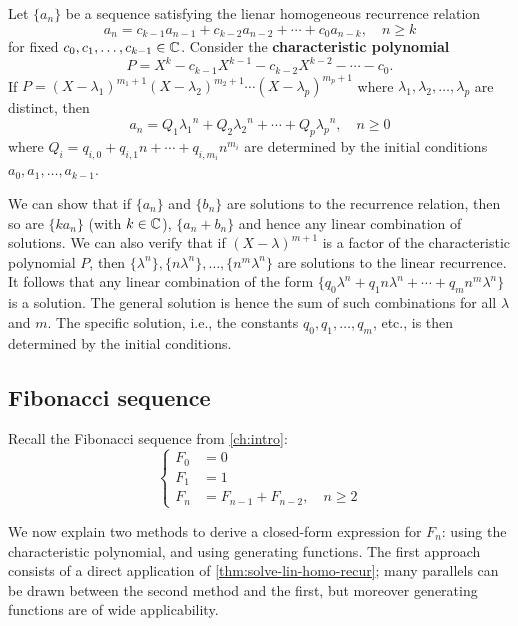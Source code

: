 \documentclass[a4paper, 12pt]{report}
\begin{document}
\begin{thm}\label{thm:solve-lin-homo-recur}
Let $\{a_n\}$ be a sequence satisfying the lienar homogeneous recurrence relation
\[a_n = c_{k - 1} a_{n - 1} + c_{k - 2} a_{n - 2} + \cdots + c_0 a_{n - k}, \quad n \geq k\]
for fixed $c_0, c_1, \dots, c_{k - 1} \in \mathbb{C}$. Consider the \textbf{characteristic polynomial} 
\[P = X^k - c_{k - 1} X^{k - 1} - c_{k - 2} X^{k - 2} - \cdots - c_0.\]
If $P = (X - \lambda_1)^{m_1 + 1} (X - \lambda_2)^{m_2 + 1} \cdots (X - \lambda_p)^{m_p + 1}$
where $\lambda_1, \lambda_2, \dots, \lambda_p$ are distinct, then 
\[a_n = Q_1 {\lambda_1}^n + Q_2 {\lambda_2}^n + \cdots + Q_p {\lambda_p}^n, \quad n \geq 0\]
where $Q_i = q_{i, 0} + q_{i, 1} n + \cdots + q_{i, m_i} n^{m_i}$ are determined by the initial conditions $a_0, a_1, \dots, a_{k - 1}$.
\end{thm}
\begin{sproof}
We can show that if $\{a_n\}$ and $\{b_n\}$ are solutions to the recurrence relation, then so are $\{k a_n\}$ (with $k \in \mathbb{C}$), $\{a_n + b_n\}$ and hence any linear combination of solutions. We can also verify that if $(X - \lambda)^{m + 1}$ is a factor of the characteristic polynomial $P$, then $\{\lambda^n\}, \{n \lambda^n\}, \dots, \{n^m \lambda^n\}$ are solutions to the linear recurrence. It follows that any linear combination of the form $\{q_0 \lambda^n + q_1 n \lambda^n + \cdots + q_m n^m \lambda^n\}$ is a solution. The general solution is hence the sum of such combinations for all $\lambda$ and $m$. The specific solution, i.e., the constants $q_0, q_1, \dots, q_m$, etc., is then determined by the initial conditions.
\end{sproof}

\subsection{Fibonacci sequence}
Recall the Fibonacci sequence from \cref{ch:intro}:
\[
\begin{cases}
F_0 &= 0\\
F_1 &= 1\\
F_n &= F_{n - 1} + F_{n - 2}, \quad n \geq 2
\end{cases}
\]

We now explain two methods to derive a closed-form expression for $F_n$: using the characteristic polynomial, and using generating functions. The first approach consists of a direct application of \cref{thm:solve-lin-homo-recur}; many parallels can be drawn between the second method and the first, but moreover generating functions are of wide applicability.
\end{document}
